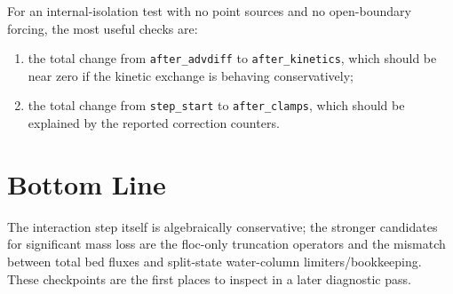 \documentclass[11pt]{article}
\begin{document}
For an internal-isolation test with no point sources and no open-boundary forcing, the most useful
checks are:
\begin{enumerate}
\item the total change from \texttt{after\_advdiff} to \texttt{after\_kinetics}, which should be
near zero if the kinetic exchange is behaving conservatively;
\item the total change from \texttt{step\_start} to \texttt{after\_clamps}, which should be
explained by the reported correction counters.
\end{enumerate}

\section{Bottom Line}
The interaction step itself is algebraically conservative; the stronger candidates for significant
mass loss are the floc-only truncation operators and the mismatch between total bed fluxes and
split-state water-column limiters/bookkeeping. These checkpoints are the first places to inspect in
a later diagnostic pass.
\end{document}
